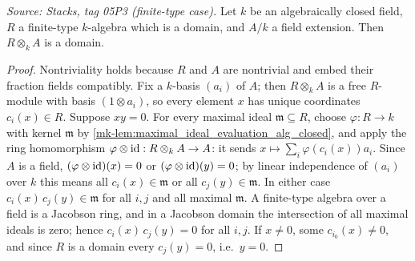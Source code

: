 \begin{lemma}\label{mk-lem:tensor_domain_finite_type_alg_closed}
  \leanok

  \textit{Source: Stacks, tag 05P3 (finite-type case).}
  Let \(k\) be an algebraically closed field, \(R\) a finite-type
  \(k\)-algebra which is a domain, and \(A/k\) a field extension. Then
  \(R \otimes_k A\) is a domain.
\end{lemma}
\begin{proof}
  \leanok
  Nontriviality holds because \(R\) and \(A\) are nontrivial and embed
  their fraction fields compatibly. Fix a \(k\)-basis \((a_i)\) of
  \(A\); then \(R \otimes_k A\) is a free \(R\)-module with basis
  \((1 \otimes a_i)\), so every element \(x\) has unique coordinates
  \(c_i(x) \in R\). Suppose \(x y = 0\). For every maximal ideal
  \(\mathfrak m \subseteq R\), choose
  \(\varphi : R \to k\) with kernel \(\mathfrak m\) by
  \ref{mk-lem:maximal_ideal_evaluation_alg_closed}, and apply the ring
  homomorphism \(\varphi \otimes \operatorname{id} : R \otimes_k A \to A\): it sends
  \(x \mapsto \sum_i \varphi(c_i(x)) a_i\). Since \(A\) is a field,
  \((\varphi \otimes \operatorname{id})(x) = 0\) or \((\varphi \otimes \operatorname{id})(y) = 0\);
  by linear independence of \((a_i)\) over \(k\) this means all
  \(c_i(x) \in \mathfrak m\) or all \(c_j(y) \in \mathfrak m\). In
  either case \(c_i(x)\, c_j(y) \in \mathfrak m\) for all \(i, j\) and
  all maximal \(\mathfrak m\). A finite-type algebra over a field is a
  Jacobson ring, and in a Jacobson domain the intersection of all
  maximal ideals is zero; hence \(c_i(x)\, c_j(y) = 0\) for all
  \(i, j\). If \(x \neq 0\), some \(c_{i_0}(x) \neq 0\), and since
  \(R\) is a domain every \(c_j(y) = 0\), i.e.\ \(y = 0\).
\end{proof}

